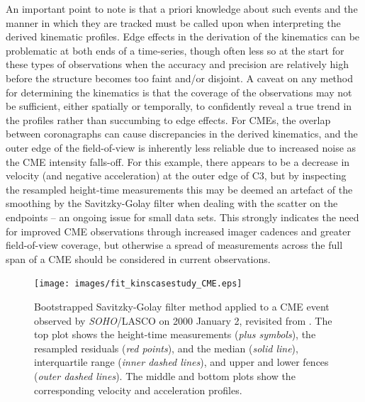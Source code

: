 \documentclass[structabstract]{aa}
\begin{document}
An important point to note is that a priori knowledge about such events and the manner in which they are tracked must be called upon when interpreting the derived kinematic profiles. Edge effects in the derivation of the kinematics can be problematic at both ends of a time-series, though often less so at the start for these types of observations when the accuracy and precision are relatively high before the structure becomes too faint and/or disjoint. A caveat on any method for determining the kinematics is that the coverage of the observations may not be sufficient, either spatially or temporally, to confidently reveal a true trend in the profiles rather than succumbing to edge effects. For CMEs, the overlap between coronagraphs can cause discrepancies in the derived kinematics, and the outer edge of the field-of-view is inherently less reliable due to increased noise as the CME intensity falls-off. For this example, there appears to be a decrease in velocity (and negative acceleration) at the outer edge of C3, but by inspecting the resampled height-time measurements this may be deemed an artefact of the smoothing by the Savitzky-Golay filter when dealing with the scatter on the endpoints -- an ongoing issue for small data sets. This strongly indicates the need for improved CME observations through increased imager cadences and greater field-of-view coverage, but otherwise a spread of measurements across the full span of a CME should be considered in current observations.

\begin{figure}[!t]
\centering
\texttt{[image: images/fit\_kinscasestudy\_CME.eps]}
\caption{Bootstrapped Savitzky-Golay filter method applied to a CME event observed by \emph{SOHO}/LASCO on 2000 January 2, revisited from \citet{2009A&A...495..325B}. The top plot shows the height-time measurements (\emph{plus symbols}), the resampled residuals (\emph{red points}), and the median (\emph{solid line}), interquartile range (\emph{inner dashed lines}), and upper and lower fences (\emph{outer dashed lines}). The middle and bottom plots show the corresponding velocity and acceleration profiles.}
\label{fig_savgol_CME}
\end{figure}
\end{document}
